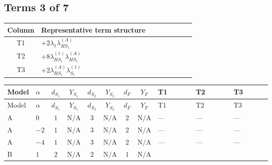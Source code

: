 \documentclass[8pt]{article}
\begin{document}
\begin{landscape}
\subsection*{Terms 3 of 7}
\begin{center}
\begin{tabular}{@{}c >{\raggedright\arraybackslash}p{0.82\linewidth}@{}}
\toprule
Column & Representative term structure \\
\midrule
T1 & \(\displaystyle +2 {\lambda_1} {\lambda_{HS_1}^{(A)}}\) \\
\midrule
T2 & \(\displaystyle +8 {\lambda_{HS_1}^{(1)}} {\lambda_{HS_1}^{(A)}}\) \\
\midrule
T3 & \(\displaystyle +2 {\lambda_{HS_1}^{(A)}} {\lambda_{S_1}^{(1)}}\) \\
\midrule
\bottomrule
\end{tabular}
\end{center}
\smallskip
\tiny
\begin{longtable}{@{}llcccccc >{\raggedright\arraybackslash}p{0.21\linewidth} >{\raggedright\arraybackslash}p{0.21\linewidth} >{\raggedright\arraybackslash}p{0.21\linewidth}@{}}
\toprule
Model & $\alpha$ & $d_{S_1}$ & $Y_{S_1}$ & $d_{S_2}$ & $Y_{S_2}$ & $d_F$ & $Y_F$ & T1 & T2 & T3 \\
\midrule
\endfirsthead
\toprule
Model & $\alpha$ & $d_{S_1}$ & $Y_{S_1}$ & $d_{S_2}$ & $Y_{S_2}$ & $d_F$ & $Y_F$ & T1 & T2 & T3 \\
\midrule
\endhead
A & $0$ & $1$ & $\text{N/A}$ & $3$ & $\text{N/A}$ & $2$ & $\text{N/A}$ & --- & --- & --- \\
\midrule
A & $-2$ & $1$ & $\text{N/A}$ & $3$ & $\text{N/A}$ & $2$ & $\text{N/A}$ & --- & --- & --- \\
\midrule
A & $-4$ & $1$ & $\text{N/A}$ & $3$ & $\text{N/A}$ & $2$ & $\text{N/A}$ & --- & --- & --- \\
\midrule
B & $1$ & $2$ & $\text{N/A}$ & $2$ & $\text{N/A}$ & $1$ & $\text{N/A}$ & \scriptsize\adjustbox{max width=\linewidth}{$\begin{gathered} +2 {\lambda_1} {\lambda_{HS_1}^{(A)}}\end{gathered}$} & \scriptsize\adjustbox{max width=\linewidth}{$\begin{gathered} +8 {\lambda_{HS_1}^{(1)}} {\lambda_{HS_1}^{(A)}}\end{gathered}$} & \scriptsize\adjustbox{max width=\linewidth}{$\begin{gathered} +2 {\lambda_{HS_1}^{(A)}} {\lambda_{S_1}^{(1)}}\end{gathered}$} \\

\end{longtable}
\end{landscape}
\end{document}
